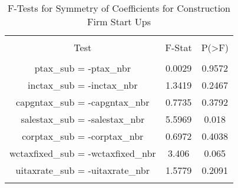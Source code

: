 
\begin{table}[!htbp] \centering 
  \caption{F-Tests for Symmetry of Coefficients for Construction Firm Start Ups} 
  \label{23Ftests} 
\begin{tabular}{@{\extracolsep{5pt}} ccc} 
\\[-1.8ex]\hline 
\hline \\[-1.8ex] 
Test & F-Stat & P(\textgreater F) \\ 
\hline \\[-1.8ex] 
ptax\_sub = -ptax\_nbr & 0.0029 & 0.9572 \\ 
inctax\_sub = -inctax\_nbr & 1.3419 & 0.2467 \\ 
capgntax\_sub = -capgntax\_nbr & 0.7735 & 0.3792 \\ 
salestax\_sub = -salestax\_nbr & 5.5969 & 0.018 \\ 
corptax\_sub = -corptax\_nbr & 0.6972 & 0.4038 \\ 
wctaxfixed\_sub = -wctaxfixed\_nbr & 3.406 & 0.065 \\ 
uitaxrate\_sub = -uitaxrate\_nbr & 1.5779 & 0.2091 \\ 
\hline \\[-1.8ex] 
\end{tabular} 
\end{table} 
